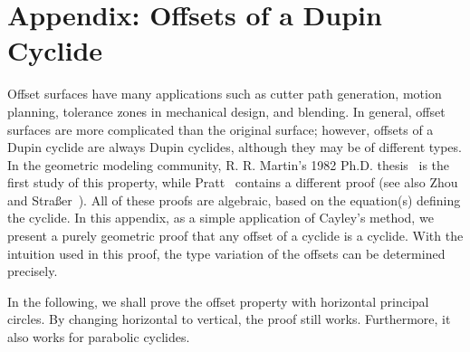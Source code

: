 
\section{Appendix: Offsets of a Dupin Cyclide}
\label{section:offsets}

     Offset surfaces 
have many applications such as
cutter path generation, motion planning, tolerance zones in mechanical design,
and blending.  In general, offset surfaces are more complicated than the
original surface; 
however, offsets of a Dupin cyclide are always Dupin cyclides, 
although they may be of different types.  In the geometric modeling community, 
R. R. Martin's 
1982 Ph.D. thesis~\cite{martin:1982} is 
the first study of this property, 
while Pratt~\cite{pratt:1990} contains
a different proof (see also Zhou and 
Stra{\ss}er~\cite{zhou-strasser:1991}).
All of these proofs are algebraic, based on the
equation(s) defining the cyclide.  In this appendix, as a simple application of
Cayley's method, 
we present a purely geometric proof that any offset of
a cyclide is a cyclide.  With the intuition used in this proof, the type 
variation of the offsets can be determined precisely.

     In the following, we shall prove the offset property with horizontal
principal circles.  By changing horizontal to vertical, the proof still works.
Furthermore, it also works for parabolic cyclides.

